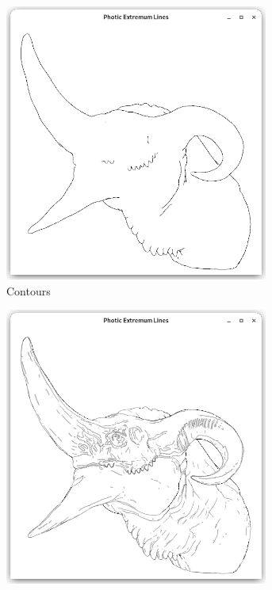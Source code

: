 \documentclass[9pt,fleqn,twoside,twocolumn]{stdglobal}
\begin{document}
\begin{figure}[h]
\begin{subfigure}[b]{0.24\textwidth}
        \includegraphics[width=0.95\textwidth,trim={15px 15 15 50},clip]{images/dragon-head-contours.png}
        \caption{Contours}
      \end{subfigure}%
      \hfill%
      \begin{subfigure}[b]{0.24\textwidth}
        \centering
        \includegraphics[width=0.95\textwidth,trim={15px 15 15 50},clip]{images/dragon-head-contour-pel-shader.png}

\end{subfigure}
\end{figure}
\end{document}
